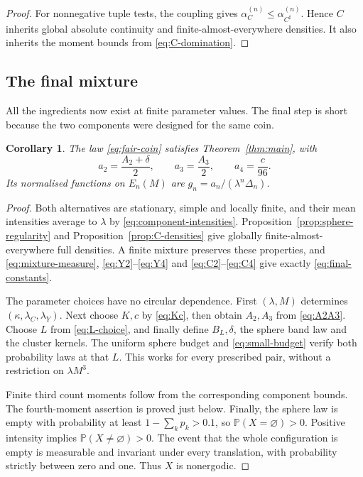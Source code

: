 \documentclass[11pt,a4paper]{article}
\numberwithin{equation}{section}
\newtheorem{corollary}[theorem]{Corollary}
\theoremstyle{definition}
\theoremstyle{remark}
\newcommand{\PP}{\mathbb P}
\begin{document}
\begin{proof}
For nonnegative tuple tests, the coupling gives
$\alpha_C^{(n)}\leq\alpha_{C^\sharp}^{(n)}$. Hence $C$ inherits global
absolute continuity and finite-almost-everywhere densities. It also
inherits the moment bounds from \eqref{eq:C-domination}.
\end{proof}

\subsection{The final mixture}

All the ingredients now exist at finite parameter values. The final step
is short because the two components were designed for the same coin.

\begin{corollary}\label{cor:mixture}
The law \eqref{eq:fair-coin} satisfies Theorem~\ref{thm:main}, with
\begin{equation}
 a_2=\frac{A_2+\delta}{2},\qquad
 a_3=\frac{A_3}{2},\qquad
 a_4=\frac{c}{96}.
 \label{eq:final-constants}
\end{equation}
Its normalised functions on $E_n(M)$ are
$g_n=a_n/(\lambda^n\Delta_n)$.
\end{corollary}
\begin{proof}
Both alternatives are stationary, simple and locally finite, and their
mean intensities average to $\lambda$ by
\eqref{eq:component-intensities}. Proposition~\ref{prop:sphere-regularity}
and Proposition~\ref{prop:C-densities} give globally finite-almost-everywhere
full densities. A finite mixture preserves these properties, and
\eqref{eq:mixture-measure}, \eqref{eq:Y2}--\eqref{eq:Y4} and
\eqref{eq:C2}--\eqref{eq:C4} give exactly \eqref{eq:final-constants}.

The parameter choices have no circular dependence. First
$(\lambda,M)$ determines $(\kappa,\lambda_C,\lambda_Y)$. Next choose
$K,c$ by \eqref{eq:Kc}, then obtain $A_2,A_3$ from
\eqref{eq:A2A3}. Choose $L$ from \eqref{eq:L-choice}, and finally define
$B_L,\delta$, the sphere band law and the cluster kernels. The uniform
sphere budget and \eqref{eq:small-budget} verify both probability laws
at that $L$. This works for every prescribed pair, without a restriction
on $\lambda M^3$.

Finite third count moments follow from the corresponding component
bounds. The fourth-moment assertion is proved just below. Finally, the
sphere law is empty with probability at least $1-\sum_kp_k>0.1$, so
$\PP(X=\varnothing)>0$. Positive intensity implies
$\PP(X\ne\varnothing)>0$. The event that the whole configuration is empty
is measurable and invariant under every translation, with probability
strictly between zero and one. Thus $X$ is nonergodic.
\end{proof}
\end{document}
